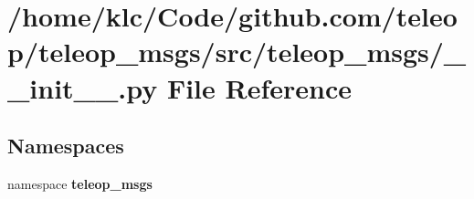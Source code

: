 \section{/home/klc/Code/github.com/teleop/teleop\_\-msgs/src/teleop\_\-msgs/\_\-\_\-init\_\-\_\-.py File Reference}
\label{____init_____8py}
\subsection*{Namespaces}
\begin{DoxyCompactItemize}
\item 
namespace {\bf teleop\_\-msgs}
\end{DoxyCompactItemize}
